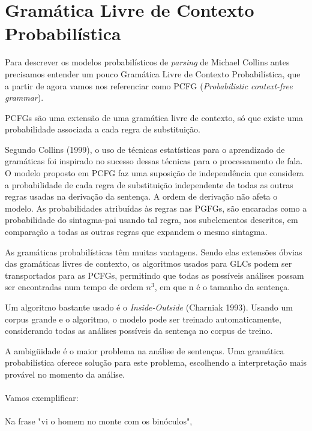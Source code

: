 \section{Gramática Livre de Contexto Probabilística}
\label{sec:pcfg}

Para descrever os modelos  probabilísticos  de \emph{parsing} de Michael Collins   antes precisamos entender um pouco Gramática Livre de Contexto Probabilística, que a partir de agora vamos nos referenciar como PCFG (\emph{Probabilistic context-free grammar}).

PCFGs são uma extensão de uma gramática livre de contexto, só que existe uma probabilidade associada a cada regra de substituição.

Segundo Collins (1999), o uso de técnicas estatísticas para o aprendizado de gramáticas foi inspirado no sucesso dessas técnicas para o processamento de fala. O modelo proposto em PCFG faz uma suposição de independência que considera a probabilidade de cada regra de substituição independente de todas as outras regras usadas na derivação da sentença. A ordem de derivação não afeta o modelo. As probabilidades atribuídas às regras nas PGFGs, são encaradas como a probabilidade do sintagma-pai usando tal regra, nos subelementos descritos, em comparação a todas as outras regras que expandem o mesmo sintagma.

As gramáticas probabilísticas têm muitas vantagens. Sendo elas extensões óbvias das gramáticas livres de contexto, os algoritmos usados para GLCs podem ser transportados para as PCFGs, permitindo que todas as possíveis análises possam ser encontradas num tempo de ordem $n^3$, em que n é o tamanho da sentença.

Um algoritmo bastante usado é o \emph{Inside-Outside} (Charniak 1993). Usando um corpus grande e o algoritmo, o modelo pode ser treinado automaticamente, considerando todas as análises possíveis da sentença no corpus de treino.

A ambigüidade é o maior problema na análise de sentenças. Uma gramática probabilística oferece solução para este problema, escolhendo a interpretação mais provável no momento da análise.
\\ \\
Vamos exemplificar:
\\ \\

Na frase "vi o homem no monte com os binóculos",
\\ \\

